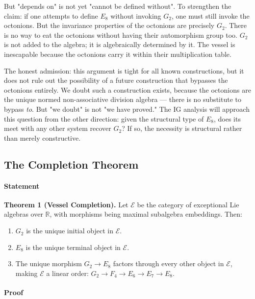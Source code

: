 \documentclass[12pt,a4paper]{article}
\begin{document}
But "depends on" is not yet "cannot be defined without". To strengthen the claim: if one attempts to define $E_8$ without invoking $G_2$, one must still invoke the octonions. But the invariance properties of the octonions are precisely $G_2$. There is no way to eat the octonions without having their automorphism group too. $G_2$ is not added to the algebra; it is algebraically determined by it. The vessel is inescapable because the octonions carry it within their multiplication table.

The honest admission: this argument is tight for all known constructions, but it does not rule out the possibility of a future construction that bypasses the octonions entirely. We doubt such a construction exists, because the octonions are the unique normed non-associative division algebra --- there is no substitute to bypass \emph{to}. But "we doubt" is not "we have proved." The IG analysis will approach this question from the other direction: given the structural type of $E_8$, does its meet with any other system recover $G_2$? If so, the necessity is structural rather than merely constructive.

\subsection{The Completion Theorem}

\paragraph{Statement}

\textbf{Theorem 1 (Vessel Completion).} Let $\mathcal{E}$ be the category of exceptional Lie algebras over $\mathbb{R}$, with morphisms being maximal subalgebra embeddings. Then:

\begin{enumerate}
    \item $G_2$ is the unique initial object in $\mathcal{E}$.
    \item $E_8$ is the unique terminal object in $\mathcal{E}$.
    \item The unique morphism $G_2 \to E_8$ factors through every other object in $\mathcal{E}$, making $\mathcal{E}$ a linear order: $G_2 \to F_4 \to E_6 \to E_7 \to E_8$.
\end{enumerate}

\paragraph{Proof}
\end{document}
